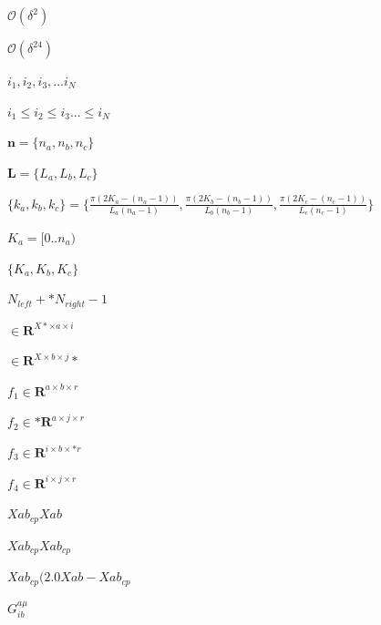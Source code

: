 \documentclass{article}
\begin{document}
$ \mathcal{O}(\delta^2) $
\pagebreak

$ \mathcal{O}(\delta^24) $
\pagebreak

$ {i_1, i_2, i_3, ... i_N} $
\pagebreak

$ i_1 \leq i_2 \leq i_3 ... \leq i_N $
\pagebreak

$ \mathbf{n} = \{n_a, n_b, n_c\} $
\pagebreak

$ \mathbf{L} = \{ L_a, L_b, L_c \} $
\pagebreak

$ \{k_a, k_b, k_c\} = \{ \frac{\pi (2 K_a - (n_a-1))}{L_a (n_a-1)}, \frac{\pi (2 K_b - (n_b-1))}{L_b (n_b-1)}, \frac{\pi (2 K_c - (n_c-1))}{L_c (n_c-1)} \} $
\pagebreak

$ K_a = [0..n_a) $
\pagebreak

$ \{ K_a, K_b, K_c \} $
\pagebreak

$ N_{left} + *N_{right} - 1 $
\pagebreak

$ \in \mathbf{R}^{X *\times a \times i} $
\pagebreak

$ \in \mathbf{R}^{X \times b \times j} *$
\pagebreak

$ f_1 \in \mathbf{R}^{a\times b \times r}$
\pagebreak

$ f_2 \in *\mathbf{R}^{a\times j \times r}$
\pagebreak

$ f_3 \in \mathbf{R}^{i\times b \times *r}$
\pagebreak

$ f_4 \in \mathbf{R}^{i\times j \times r}$
\pagebreak

$ Xab_{cp} Xab $
\pagebreak

$ Xab_{cp} Xab_{cp}$
\pagebreak

$ Xab_{cp} (2.0 Xab - Xab_{cp} $
\pagebreak

$ G^{a \mu}_{ib} $
\pagebreak
\end{document}
